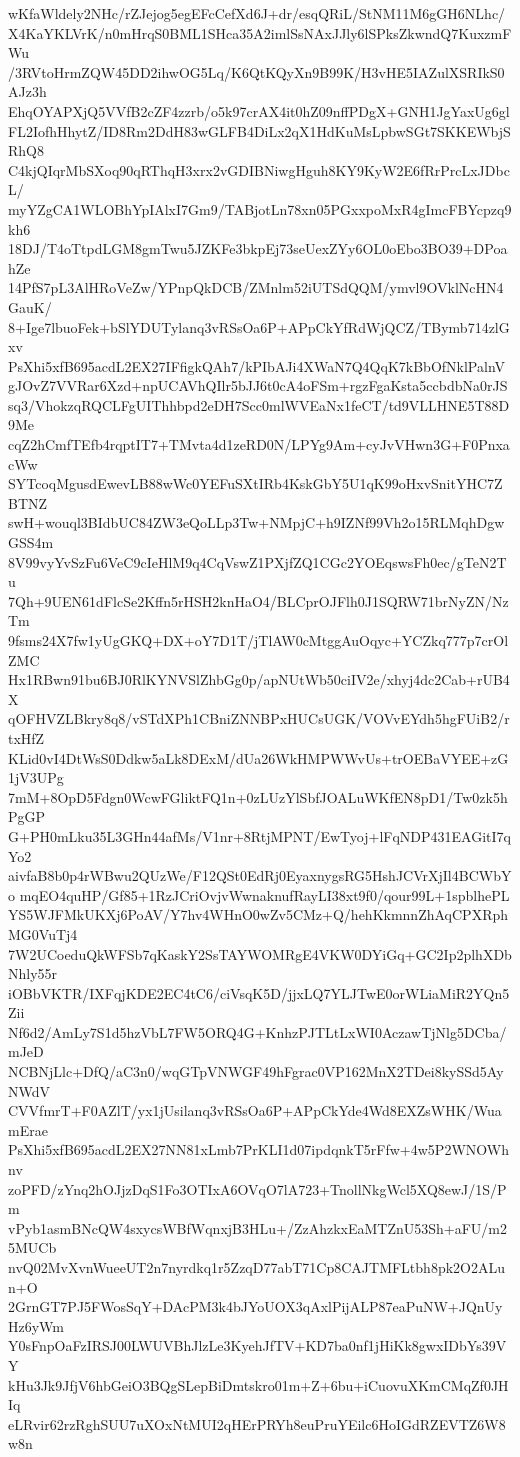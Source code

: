 wKfaWldely2NHc/rZJejog5egEFcCefXd6J+dr/esqQRiL/StNM11M6gGH6NLhc/
X4KaYKLVrK/n0mHrqS0BML1SHca35A2imlSsNAxJJly6lSPksZkwndQ7KuxzmFWu
/3RVtoHrmZQW45DD2ihwOG5Lq/K6QtKQyXn9B99K/H3vHE5IAZulXSRIkS0AJz3h
EhqOYAPXjQ5VVfB2cZF4zzrb/o5k97crAX4it0hZ09nffPDgX+GNH1JgYaxUg6gl
FL2IofhHhytZ/ID8Rm2DdH83wGLFB4DiLx2qX1HdKuMsLpbwSGt7SKKEWbjSRhQ8
C4kjQIqrMbSXoq90qRThqH3xrx2vGDIBNiwgHguh8KY9KyW2E6fRrPrcLxJDbcL/
myYZgCA1WLOBhYpIAlxI7Gm9/TABjotLn78xn05PGxxpoMxR4gImcFBYcpzq9kh6
18DJ/T4oTtpdLGM8gmTwu5JZKFe3bkpEj73seUexZYy6OL0oEbo3BO39+DPoahZe
14PfS7pL3AlHRoVeZw/YPnpQkDCB/ZMnlm52iUTSdQQM/ymvl9OVklNcHN4GauK/
8+Ige7lbuoFek+bSlYDUTylanq3vRSsOa6P+APpCkYfRdWjQCZ/TBymb714zlGxv
PsXhi5xfB695acdL2EX27IFfigkQAh7/kPIbAJi4XWaN7Q4QqK7kBbOfNklPalnV
gJOvZ7VVRar6Xzd+npUCAVhQIlr5bJJ6t0cA4oFSm+rgzFgaKsta5ccbdbNa0rJS
sq3/VhokzqRQCLFgUIThhbpd2eDH7Scc0mlWVEaNx1feCT/td9VLLHNE5T88D9Me
cqZ2hCmfTEfb4rqptIT7+TMvta4d1zeRD0N/LPYg9Am+cyJvVHwn3G+F0PnxacWw
SYTcoqMgusdEwevLB88wWc0YEFuSXtIRb4KskGbY5U1qK99oHxvSnitYHC7ZBTNZ
swH+wouql3BIdbUC84ZW3eQoLLp3Tw+NMpjC+h9IZNf99Vh2o15RLMqhDgwGSS4m
8V99vyYvSzFu6VeC9cIeHlM9q4CqVswZ1PXjfZQ1CGc2YOEqswsFh0ec/gTeN2Tu
7Qh+9UEN61dFlcSe2Kffn5rHSH2knHaO4/BLCprOJFlh0J1SQRW71brNyZN/NzTm
9fsms24X7fw1yUgGKQ+DX+oY7D1T/jTlAW0cMtggAuOqyc+YCZkq777p7crOlZMC
Hx1RBwn91bu6BJ0RlKYNVSlZhbGg0p/apNUtWb50ciIV2e/xhyj4dc2Cab+rUB4X
qOFHVZLBkry8q8/vSTdXPh1CBniZNNBPxHUCsUGK/VOVvEYdh5hgFUiB2/rtxHfZ
KLid0vI4DtWsS0Ddkw5aLk8DExM/dUa26WkHMPWWvUs+trOEBaVYEE+zG1jV3UPg
7mM+8OpD5Fdgn0WcwFGliktFQ1n+0zLUzYlSbfJOALuWKfEN8pD1/Tw0zk5hPgGP
G+PH0mLku35L3GHn44afMs/V1nr+8RtjMPNT/EwTyoj+lFqNDP431EAGitI7qYo2
aivfaB8b0p4rWBwu2QUzWe/F12QSt0EdRj0EyaxnygsRG5HshJCVrXjIl4BCWbYo
mqEO4quHP/Gf85+1RzJCriOvjvWwnaknufRayLI38xt9f0/qour99L+1spblhePL
YS5WJFMkUKXj6PoAV/Y7hv4WHnO0wZv5CMz+Q/hehKkmnnZhAqCPXRphMG0VuTj4
7W2UCoeduQkWFSb7qKaskY2SsTAYWOMRgE4VKW0DYiGq+GC2Ip2plhXDbNhly55r
iOBbVKTR/IXFqjKDE2EC4tC6/ciVsqK5D/jjxLQ7YLJTwE0orWLiaMiR2YQn5Zii
Nf6d2/AmLy7S1d5hzVbL7FW5ORQ4G+KnhzPJTLtLxWI0AczawTjNlg5DCba/mJeD
NCBNjLlc+DfQ/aC3n0/wqGTpVNWGF49hFgrac0VP162MnX2TDei8kySSd5AyNWdV
CVVfmrT+F0AZlT/yx1jUsilanq3vRSsOa6P+APpCkYde4Wd8EXZsWHK/WuamErae
PsXhi5xfB695acdL2EX27NN81xLmb7PrKLI1d07ipdqnkT5rFfw+4w5P2WNOWhnv
zoPFD/zYnq2hOJjzDqS1Fo3OTIxA6OVqO7lA723+TnollNkgWcl5XQ8ewJ/1S/Pm
vPyb1asmBNcQW4sxycsWBfWqnxjB3HLu+/ZzAhzkxEaMTZnU53Sh+aFU/m25MUCb
nvQ02MvXvnWueeUT2n7nyrdkq1r5ZzqD77abT71Cp8CAJTMFLtbh8pk2O2ALun+O
2GrnGT7PJ5FWosSqY+DAcPM3k4bJYoUOX3qAxlPijALP87eaPuNW+JQnUyHz6yWm
Y0sFnpOaFzIRSJ00LWUVBhJlzLe3KyehJfTV+KD7ba0nf1jHiKk8gwxIDbYs39VY
kHu3Jk9JfjV6hbGeiO3BQgSLepBiDmtskro01m+Z+6bu+iCuovuXKmCMqZf0JHIq
eLRvir62rzRghSUU7uXOxNtMUI2qHErPRYh8euPruYEilc6HoIGdRZEVTZ6W8w8n
